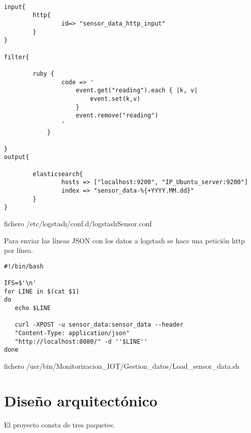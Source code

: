 \begin{verbatim}    

input{
        http{
                id=> "sensor_data_http_input"
        }
}

filter{

        ruby {
                code => '
                    event.get("reading").each { |k, v|
                        event.set(k,v)
                    }
                    event.remove("reading")
                '
            }

}
output{

        elasticsearch{
                hosts => ["localhost:9200", "IP_Ubuntu_server:9200"]
                index => "sensor_data-%{+YYYY.MM.dd}"
        }
}

\end{verbatim}  
\caption{fichero  /etc/logstash/conf.d/logstashSensor.conf}    


Para enviar las líneas JSON con los datos a logstash se hace una petición http por línea.
\begin{verbatim}    
#!/bin/bash

IFS=$'\n'
for LINE in $(cat $1)
do
   echo $LINE
   
   curl -XPOST -u sensor_data:sensor_data --header 
   "Content-Type: application/json" 
   "http://localhost:8080/" -d ''$LINE''
done
\end{verbatim}  
\caption{fichero /usr/bin/Monitorizacion\_IOT/Gestion\_datos/Load\_sensor\_data.sh}    

\section{Diseño arquitectónico}

El proyecto consta de tres paquetes.

